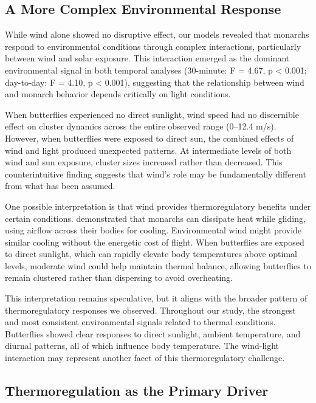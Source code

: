 \subsection{A More Complex Environmental Response}

While wind alone showed no disruptive effect, our models revealed that monarchs respond to environmental conditions through complex interactions, particularly between wind and solar exposure. This interaction emerged as the dominant environmental signal in both temporal analyses (30-minute: F = 4.67, p < 0.001; day-to-day: F = 4.10, p < 0.001), suggesting that the relationship between wind and monarch behavior depends critically on light conditions.

When butterflies experienced no direct sunlight, wind speed had no discernible effect on cluster dynamics across the entire observed range (0--12.4 m/s). However, when butterflies were exposed to direct sun, the combined effects of wind and light produced unexpected patterns. At intermediate levels of both wind and sun exposure, cluster sizes increased rather than decreased. This counterintuitive finding suggests that wind's role may be fundamentally different from what has been assumed.

One possible interpretation is that wind provides thermoregulatory benefits under certain conditions. \textcite{mastersMonarchButterflyDanaus1988} demonstrated that monarchs can dissipate heat while gliding, using airflow across their bodies for cooling. Environmental wind might provide similar cooling without the energetic cost of flight. When butterflies are exposed to direct sunlight, which can rapidly elevate body temperatures above optimal levels, moderate wind could help maintain thermal balance, allowing butterflies to remain clustered rather than dispersing to avoid overheating.

This interpretation remains speculative, but it aligns with the broader pattern of thermoregulatory responses we observed. Throughout our study, the strongest and most consistent environmental signals related to thermal conditions. Butterflies showed clear responses to direct sunlight, ambient temperature, and diurnal patterns, all of which influence body temperature. The wind-light interaction may represent another facet of this thermoregulatory challenge.

\subsection{Thermoregulation as the Primary Driver}

